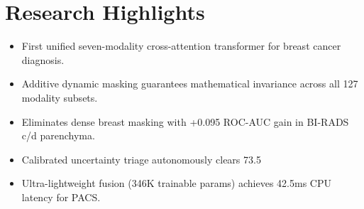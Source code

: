 \documentclass[11pt]{article}
\begin{document}
\section*{Research Highlights}
\begin{itemize}
\item First unified seven-modality cross-attention transformer for breast cancer diagnosis.
\item Additive dynamic masking guarantees mathematical invariance across all 127 modality subsets.
\item Eliminates dense breast masking with +0.095 ROC-AUC gain in BI-RADS c/d parenchyma.
\item Calibrated uncertainty triage autonomously clears 73.5%
\item Ultra-lightweight fusion (346K trainable params) achieves 42.5ms CPU latency for PACS.
\end{itemize}
\end{document}
